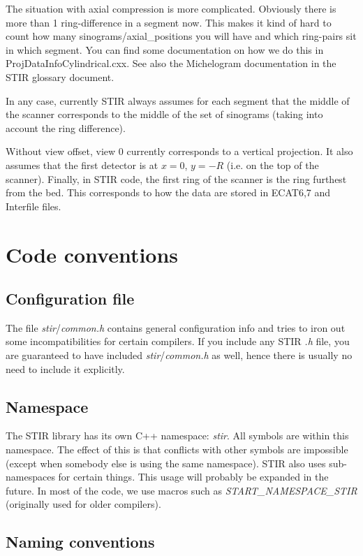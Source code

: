\documentclass{article}
\begin{document}
The situation with axial compression is more complicated. 
Obviously there is more than 1 ring-difference in a segment now. 
This makes it kind of hard to count how many sinograms/axial\_positions 
you will have and which ring-pairs sit in which segment. You 
can find some documentation on how we do this in ProjDataInfoCylindrical.cxx. 
See also the Michelogram documentation in the STIR glossary document. 


In any case, currently STIR always assumes for each segment that 
the middle of the scanner corresponds to the middle of the set 
of sinograms (taking into account the ring difference). 

Without view offset, view 0 currently corresponds to a vertical projection.
It also assumes that the first detector is at $x=0$, $y=-R$ (i.e.
on the top of the scanner).
Finally, in STIR code, the first 
ring of the scanner is the ring furthest from the bed. This corresponds 
to how the data are stored in ECAT6,7 and Interfile files.

\section{
Code conventions}


\subsection{
Configuration file}

The file \textit{stir}/\textit{common.h} contains general configuration 
info and tries to iron out some incompatibilities for certain 
compilers. If you include any STIR \textit{.h} file, you are guaranteed 
to have included \textit{stir}/\textit{common.h} as well, hence there is usually no need
to include it explicitly.

\subsection{
Namespace}

The STIR library has its own C++ namespace: \textit{stir}. All symbols 
are within this namespace. The effect of this is that conflicts 
with other symbols are impossible (except when somebody else 
is using the same namespace). STIR also uses sub-namespaces for 
certain things. This usage will probably be expanded in the future.
In most of the code, we use macros such as \textit{START\_NAMESPACE\_STIR}
(originally used for older compilers).

\subsection{
Naming conventions }
\end{document}
